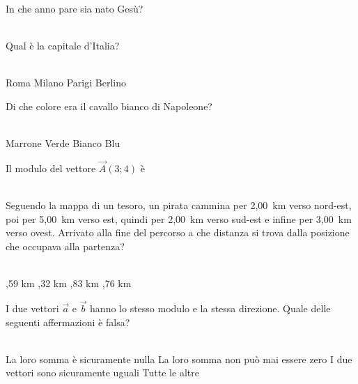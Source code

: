 \documentclass[a4paper,11pt]{exam}
\begin{document}
        \begin{center} 
        \end{center}
\begin{questions}

    
\question In che anno pare sia nato Gesù?\\\
\begin{oneparchoices}
  \choice 20
\end{oneparchoices}

    
\question Qual è la capitale d’Italia?\\\
\begin{oneparchoices}
  \choice Roma
  \choice Milano
  \choice Parigi
  \choice Berlino
\end{oneparchoices}

    
\question Di che colore era il cavallo bianco di Napoleone?\\\
\begin{oneparchoices}
  \choice Marrone
  \choice Verde
  \choice Bianco
  \choice Blu 
\end{oneparchoices}

    
\question Il modulo del vettore $\vec{A}(3;4)$ è\\\
\begin{oneparchoices}
  \choice 8
  \choice 12
  \choice 25
\end{oneparchoices}

    
\question Seguendo la mappa di un tesoro, un pirata cammina per 2,00~km verso nord-est, poi per 5,00~km verso est, quindi per 2,00~km verso sud-est e infine per 3,00~km verso ovest. Arrivato alla fine del percorso a che distanza si trova dalla posizione che occupava alla partenza?\\\
\begin{oneparchoices}
  \choice 4,59 km
  \choice 6,32 km
  \choice 4,83 km
  \choice 4,76 km
\end{oneparchoices}

    
\question I due vettori $\vec{a}$ e $\vec{b}$ hanno lo stesso modulo e la stessa direzione. Quale delle seguenti affermazioni è falsa?\\\
\begin{oneparchoices}
  \choice La loro somma è sicuramente nulla
  \choice La loro somma non può mai essere zero
  \choice I due vettori sono sicuramente uguali
  \choice Tutte le altre
\end{oneparchoices}


\end{questions}
\end{document}
